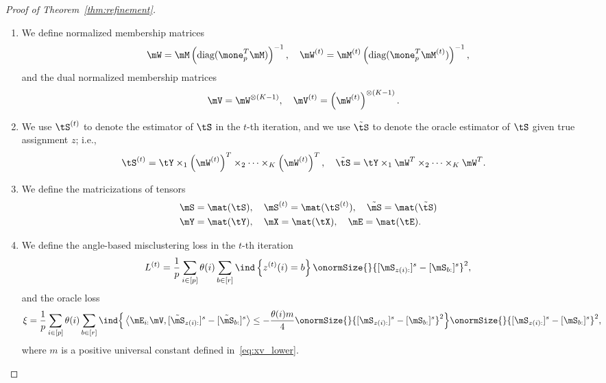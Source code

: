 \documentclass[lettersize,onecolumn,journal]{IEEEtran}
\theoremstyle{definition}
\theoremstyle{definition}
\newcommand{\of}[1]{\left(#1\right)}
\newcommand{\offf}[1]{\left\{#1\right\}}
\newcommand{\ang}[1]{\left\langle#1\right\rangle}
\begin{document}
\begin{proof}[Proof of Theorem~\ref{thm:refinement}]
\begin{enumerate}[wide]
    \item We define normalized membership matrices
    \begin{align}
        \mW = \mM \of{ \text{diag}(\mone_{p}^T \mM) }^{-1}, \quad \mW^{(t)} = \mM^{(t)} \of{ \text{diag}(\mone_{p}^T \mM^{(t)}) }^{-1},
    \end{align}
    and the dual normalized membership matrices
    \begin{align}
         \mV &= \mW^{\otimes (K-1)}, \quad \mV^{(t)} =\of{ \mW^{(t)}}^{\otimes (K-1)}.
    \end{align}
    \item We use $\tS^{(t)}$ to denote the estimator of $\tS$ in the $t$-th iteration, and we use $\tilde \tS$ to denote the oracle estimator of $\tS$ given true assignment $z$; i.e.,
    \begin{align}
        \tS^{(t)} = \tY \times_1 \of{\mW^{(t)}}^T \times_2 \cdots \times_K \of{\mW^{(t)}}^T, \quad \tilde \tS &= \tY \times_1 \mW^T \times_2 \cdots \times_K \mW^T.
    \end{align}
    \item We define the matricizations of tensors
    \begin{align}
        &\mS = \mat(\tS), \quad \mS^{(t)} = \mat(\tS^{(t)}), \quad \tilde \mS = \mat(\tilde \tS)\\
        &\mY = \mat(\tY), \quad \mX = \mat(\tX), \quad \mE = \mat(\tE).
    \end{align}
    \item We define the angle-based misclustering loss in the $t$-th iteration 
    \begin{equation}
         L^{(t)} = \frac{1}{p}  \sum_{i \in [p]} \theta(i) \sum_{b \in [r]}  \ind \offf{ z^{(t)}(i) = b } \onormSize{}{ [ \mS_{ z(i):}  ]^s - [ \mS_{b:}  ]^s  }^2,
    \end{equation}
     and the oracle loss
    \begin{align}
         \xi & = \frac{1}{p} \sum_{i \in [p]} \theta(i) \sum_{b \in [r]} \ind \Big\{\ang{ \mE_{i:} \mV, [  \tilde \mS_{z(i):} ]^s - [  \tilde \mS_{b:} ]^s}  \leq - \frac{ \theta(i) m}{4} \onormSize{}{ [ \mS_{z(i):}  ]^s - [ \mS_{b:}  ]^s  }^2 \Big\} \onormSize{}{ [ \mS_{z(i):}  ]^s - [ \mS_{ b:}  ]^s  }^2,
    \end{align}
    where $m$ is a positive universal constant defined in~\eqref{eq:xv_lower}.
\end{enumerate}


\end{proof}
\end{document}
